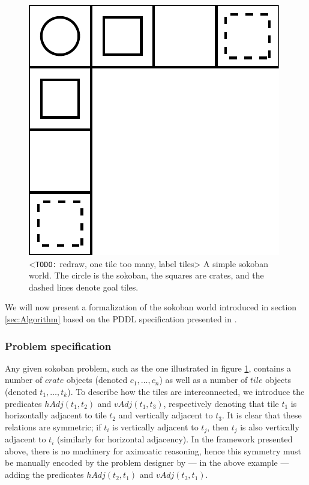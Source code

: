 \documentclass[../Master.tex]{subfiles}
\begin{document}
\begin{figure}
    \centering
    \includegraphics[scale=0.7]{Graphics/soko1}
    \caption{\label{fig:simpleSokoban} <\texttt{TODO:} redraw, one tile too many, label tiles> A simple sokoban world. The circle is the sokoban, the squares are crates, and the dashed lines denote goal tiles.}
\end{figure}

We will now present a formalization of the sokoban world introduced in section \ref{sec:Algorithm} based on the PDDL specification presented in \cite{BS2011}.

\subsubsection{Problem specification}
Any given sokoban problem, such as the one illustrated in figure \ref{fig:simpleSokoban}, contains a number of $crate$ objects (denoted $c_1, \dots, c_n$) as well as a number of $tile$ objects (denoted $t_1, \dots, t_k$). To describe how the tiles are interconnected, we introduce the predicates $hAdj(t_1,t_2)$ and $vAdj(t_1,t_3)$, respectively denoting that tile $t_1$ is horizontally adjacent to tile $t_2$ and vertically adjacent to $t_3$. It is clear that these relations are symmetric; if $t_i$ is vertically adjacent to $t_j$, then $t_j$ is also vertically adjacent to $t_i$ (similarly for horizontal adjacency). In the framework presented above, there is no machinery for aximoatic reasoning, hence this symmetry must be manually encoded by the problem designer by --- in the above example --- adding the predicates $hAdj(t_2,t_1)$ and $vAdj(t_3,t_1)$.
\end{document}
